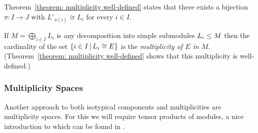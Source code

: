 \begin{remark}
  \label{remark: uniqueness of multiplicities alternative formulation}
  Theorem~\ref{theorem: multiplicity well-defined} states that there exists a bijection $\pi \colon I \to J$ with $L'_{\pi(i)} \cong L_i$ for every $i \in I$.
\end{remark}


\begin{definition}
  If $M = \bigoplus_{i \in I} L_i$ is any decomposition into simple submodules $L_i \leq M$ then the cardinality of the set $\{i \in I \suchthat L_i \cong E\}$ is the \emph{multiplicity of $E$ in $M$}.
  (Theorem~\ref{theorem: multiplicity well-defined} shows that this multiplicity is well-defined.)
\end{definition}





\subsubsection{Multiplicity Spaces}


\begin{fluff}
  Another approach to both isotypical components and multiplicities are multiplicity spaces.
  For this we will require tensor products of modules, a nice introduction to which can be found in \cite[Chapter 10.4]{DummitFoote2004}.
\end{fluff}


